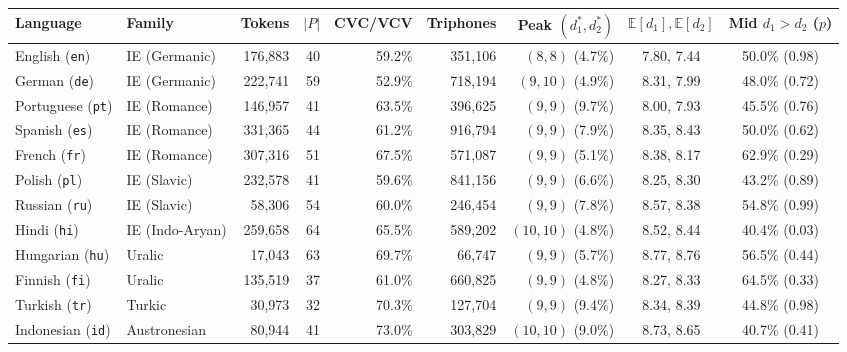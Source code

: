 \documentclass{interact}
\begin{document}
\begin{table}[htbp]
{\begin{tabular}{llrrrrrcc}
\toprule
Language & Family & Tokens & $|P|$ & CVC/VCV & Triphones & Peak $(d_1^*, d_2^*)$ & $\mathbb{E}[d_1], \mathbb{E}[d_2]$ & Mid $d_1>d_2$ ($p$) \\
\midrule
English (\texttt{en})    & IE (Germanic)    & 176,883 & 40 & 59.2\% & 351,106 & $(8,8)$ (4.7\%)   & 7.80, 7.44 & 50.0\% (0.98) \\
German (\texttt{de})     & IE (Germanic)    & 222,741 & 59 & 52.9\% & 718,194 & $(9,10)$ (4.9\%)  & 8.31, 7.99 & 48.0\% (0.72) \\
Portuguese (\texttt{pt}) & IE (Romance)     & 146,957 & 41 & 63.5\% & 396,625 & $(9,9)$ (9.7\%)   & 8.00, 7.93 & 45.5\% (0.76) \\
Spanish (\texttt{es})    & IE (Romance)     & 331,365 & 44 & 61.2\% & 916,794 & $(9,9)$ (7.9\%)   & 8.35, 8.43 & 50.0\% (0.62) \\
French (\texttt{fr})     & IE (Romance)     & 307,316 & 51 & 67.5\% & 571,087 & $(9,9)$ (5.1\%)   & 8.38, 8.17 & 62.9\% (0.29) \\
Polish (\texttt{pl})     & IE (Slavic)      & 232,578 & 41 & 59.6\% & 841,156 & $(9,9)$ (6.6\%)   & 8.25, 8.30 & 43.2\% (0.89) \\
Russian (\texttt{ru})    & IE (Slavic)      &  58,306 & 54 & 60.0\% & 246,454 & $(9,9)$ (7.8\%)   & 8.57, 8.38 & 54.8\% (0.99) \\
Hindi (\texttt{hi})      & IE (Indo-Aryan)  & 259,658 & 64 & 65.5\% & 589,202 & $(10,10)$ (4.8\%) & 8.52, 8.44 & 40.4\% (0.03) \\
Hungarian (\texttt{hu})  & Uralic           &  17,043 & 63 & 69.7\% &  66,747 & $(9,9)$ (5.7\%)   & 8.77, 8.76 & 56.5\% (0.44) \\
Finnish (\texttt{fi})    & Uralic           & 135,519 & 37 & 61.0\% & 660,825 & $(9,9)$ (4.8\%)   & 8.27, 8.33 & 64.5\% (0.33) \\
Turkish (\texttt{tr})    & Turkic           &  30,973 & 32 & 70.3\% & 127,704 & $(9,9)$ (9.4\%)   & 8.34, 8.39 & 44.8\% (0.98) \\
Indonesian (\texttt{id}) & Austronesian     &  80,944 & 41 & 73.0\% & 303,829 & $(10,10)$ (9.0\%) & 8.73, 8.65 & 40.7\% (0.41) \\

\end{tabular}}
\end{table}
\end{document}

